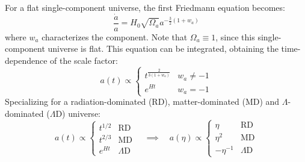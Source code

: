 For a flat single-component universe, the first Friedmann equation becomes:
\begin{equation}
  \frac{\dot{a}}{a} = H_0 \sqrt{\Omega_a} a^{- \frac{3}{2} \left( 1 + w_a \right)}
  \label{eq:a-sing-comp}
\end{equation}
where $ w_a $ characterizes the component. Note that $ \Omega_a \equiv 1 $, since this single-component universe is flat. This equation can be integrated, obtaining the time-dependence of the scale factor:
\begin{equation}
  a(t) \propto
  \begin{cases}
    t^{\frac{2}{3 \left( 1 + w_a \right)}} & w_a \neq -1 \\
    e^{Ht} & w_a = -1
  \end{cases}
\end{equation}
Specializing for a radiation-dominated (RD), matter-dominated (MD) and $ \Lambda $-dominated ($ \Lambda $D) universe:
\begin{equation}
  a(t) \propto
  \begin{cases}
    t^{1/2} & \text{RD} \\
    t^{2/3} & \text{MD} \\
    e^{Ht} & \Lambda\text{D}
  \end{cases}
  \quad \implies \quad
  a(\eta) \propto
  \begin{cases}
    \eta & \text{RD} \\
    \eta^2 & \text{MD} \\
    - \eta^{-1} & \Lambda\text{D}
  \end{cases}
  \label{eq:a-matt}
\end{equation}










